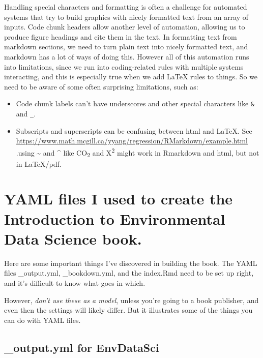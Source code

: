 \documentclass[
]{book}
\providecommand{\tightlist}{%
  \setlength{\itemsep}{0pt}\setlength{\parskip}{0pt}}
\begin{document}
Handling special characters and formatting is often a challenge for automated systems that try to build graphics with nicely formatted text from an array of inputs. Code chunk headers allow another level of automation, allowing us to produce figure headings and cite them in the text. In formatting text from markdown sections, we need to turn plain text into nicely formatted text, and markdown has a lot of ways of doing this. However all of this automation runs into limitations, since we run into coding-related rules with multiple systems interacting, and this is especially true when we add LaTeX rules to things. So we need to be aware of some often surprising limitations, such as:

\begin{itemize}
\tightlist
\item
  Code chunk labels can't have underscores and other special characters like \texttt{\&} and \texttt{\_}.
\item
  Subscripts and superscripts can be confusing between html and LaTeX. See \url{https://www.math.mcgill.ca/yyang/regression/RMarkdown/example.html} .using \textasciitilde{} and \^{} like CO\textsubscript{2} and X\textsuperscript{2} might work in Rmarkdown and html, but not in LaTeX/pdf.
\end{itemize}

\hypertarget{yaml-files-i-used-to-create-the-introduction-to-environmental-data-science-book.}{%
\section{YAML files I used to create the Introduction to Environmental Data Science book.}\label{yaml-files-i-used-to-create-the-introduction-to-environmental-data-science-book.}}

Here are some important things I've discovered in building the book. The YAML files \_output.yml, \_bookdown.yml, and the index.Rmd need to be set up right, and it's difficult to know what goes in which.

However, \emph{don't use these as a model}, unless you're going to a book publisher, and even then the settings will likely differ. But it illustrates some of the things you can do with YAML files.

\hypertarget{output.yml-for-envdatasci}{%
\subsection{\_output.yml for EnvDataSci}\label{output.yml-for-envdatasci}}
\end{document}
